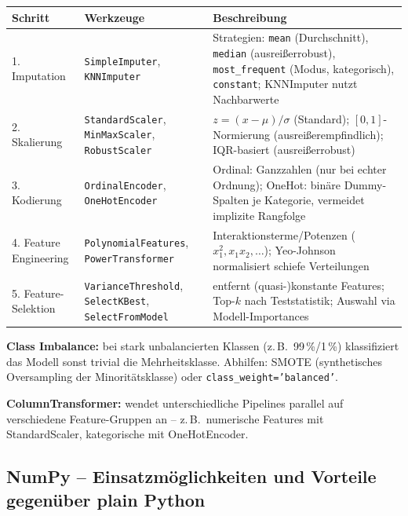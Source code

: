 \begin{table}[H]
  \centering
  \begin{tabularx}{\linewidth}{L{2.6cm} L{4.6cm} L{6.8cm}}
    \textbf{Schritt} & \textbf{Werkzeuge} & \textbf{Beschreibung} \\
    . Imputation & \texttt{SimpleImputer}, \texttt{KNNImputer} & Strategien: \texttt{mean} (Durchschnitt), \texttt{median} (ausreißerrobust), \texttt{most\_frequent} (Modus, kategorisch), \texttt{constant}; KNNImputer nutzt Nachbarwerte \\
    2. Skalierung & \texttt{StandardScaler}, \texttt{MinMaxScaler}, \texttt{RobustScaler} & $z=(x-\mu)/\sigma$ (Standard); $[0,1]$-Normierung (ausreißerempfindlich); IQR-basiert (ausreißerrobust) \\
    3. Kodierung & \texttt{OrdinalEncoder}, \texttt{OneHotEncoder} & Ordinal: Ganzzahlen (nur bei echter Ordnung); OneHot: binäre Dummy-Spalten je Kategorie, vermeidet implizite Rangfolge \\
    4. Feature Engineering & \texttt{PolynomialFeatures}, \texttt{PowerTransformer} & Interaktionsterme/Potenzen ($x_1^2, x_1x_2,\ldots$); Yeo-Johnson normalisiert schiefe Verteilungen \\
    5. Feature-Selektion & \texttt{VarianceThreshold}, \texttt{SelectKBest}, \texttt{SelectFromModel} & entfernt (quasi-)konstante Features; Top-$k$ nach Teststatistik; Auswahl via Modell-Importances \\
  \end{tabularx}
\end{table}

\textbf{Class Imbalance:} bei stark unbalancierten Klassen (z.\,B.\ 99\,\%/1\,\%) klassifiziert das Modell sonst trivial die Mehrheitsklasse. Abhilfen: SMOTE (synthetisches Oversampling der Minoritätsklasse) oder \texttt{class\_weight='balanced'}.

\textbf{ColumnTransformer:} wendet unterschiedliche Pipelines parallel auf verschiedene Feature-Gruppen an -- z.\,B.\ numerische Features mit StandardScaler, kategorische mit OneHotEncoder.

\newpage

\subsection{NumPy -- Einsatzmöglichkeiten und Vorteile gegenüber \glqq plain\grqq{} Python}


